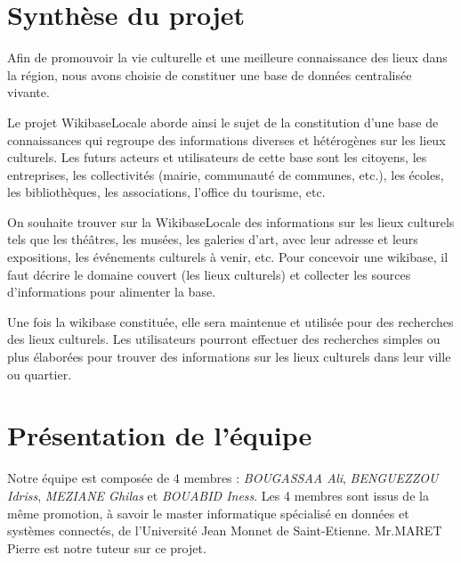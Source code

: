 \documentclass[a4paper, 12pt]{article}
\begin{document}
\section{Synthèse du projet}

Afin de promouvoir la vie culturelle et une meilleure connaissance des lieux dans la région, nous avons choisie de constituer une base de données centralisée vivante.

Le projet WikibaseLocale aborde ainsi le sujet de la constitution d'une base de connaissances qui regroupe des informations diverses et hétérogènes sur les lieux culturels. Les futurs acteurs et utilisateurs de cette base sont les citoyens, les entreprises, les collectivités (mairie, communauté de communes, etc.), les écoles, les bibliothèques, les associations, l'office du tourisme, etc.

On souhaite trouver sur la WikibaseLocale des informations sur les lieux culturels tels que les théâtres, les musées, les galeries d'art, avec leur adresse et leurs expositions, les événements culturels à venir, etc. Pour concevoir une wikibase, il faut décrire le domaine couvert (les lieux culturels) et collecter les sources d'informations pour alimenter la base. 

Une fois la wikibase constituée, elle sera maintenue et utilisée pour des recherches des lieux culturels. Les utilisateurs pourront effectuer des recherches simples ou plus élaborées pour trouver des informations sur les lieux culturels dans leur ville ou quartier.




\section {Présentation de l'équipe}
\begin{flushleft}

Notre équipe est composée de 4 membres : \textit{BOUGASSAA Ali}, \textit{BENGUEZZOU Idriss}, \textit{MEZIANE Ghilas} et \textit{BOUABID Iness}. Les 4 membres sont issus de la même promotion, à savoir le master informatique spécialisé en données et systèmes connectés, de l'Université Jean Monnet de Saint-Etienne.
Mr.MARET Pierre est notre tuteur sur ce projet.
\end{flushleft}
\end{document}
